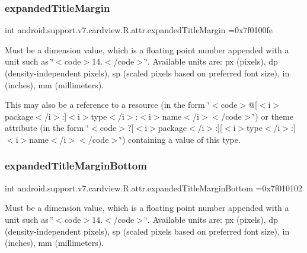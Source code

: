 \subsubsection{\texorpdfstring{expanded\+Title\+Margin}{expandedTitleMargin}}
{\footnotesize\ttfamily int android.\+support.\+v7.\+cardview.\+R.\+attr.\+expanded\+Title\+Margin =0x7f0100fe\hspace{0.3cm}{\ttfamily [static]}}

Must be a dimension value, which is a floating point number appended with a unit such as \char`\"{}$<$code$>$14.\+5sp$<$/code$>$\char`\"{}. Available units are\+: px (pixels), dp (density-\/independent pixels), sp (scaled pixels based on preferred font size), in (inches), mm (millimeters). 

This may also be a reference to a resource (in the form \char`\"{}$<$code$>$@\mbox{[}$<$i$>$package$<$/i$>$\+:\mbox{]}$<$i$>$type$<$/i$>$\+:$<$i$>$name$<$/i$>$$<$/code$>$\char`\"{}) or theme attribute (in the form \char`\"{}$<$code$>$?\mbox{[}$<$i$>$package$<$/i$>$\+:\mbox{]}\mbox{[}$<$i$>$type$<$/i$>$\+:\mbox{]}$<$i$>$name$<$/i$>$$<$/code$>$\char`\"{}) containing a value of this type. \mbox{\label{classandroid_1_1support_1_1v7_1_1cardview_1_1R_1_1attr_a878bd32d2efa5f44c68c548991a7680b}} 
\subsubsection{\texorpdfstring{expanded\+Title\+Margin\+Bottom}{expandedTitleMarginBottom}}
{\footnotesize\ttfamily int android.\+support.\+v7.\+cardview.\+R.\+attr.\+expanded\+Title\+Margin\+Bottom =0x7f010102\hspace{0.3cm}{\ttfamily [static]}}

Must be a dimension value, which is a floating point number appended with a unit such as \char`\"{}$<$code$>$14.\+5sp$<$/code$>$\char`\"{}. Available units are\+: px (pixels), dp (density-\/independent pixels), sp (scaled pixels based on preferred font size), in (inches), mm (millimeters). 

